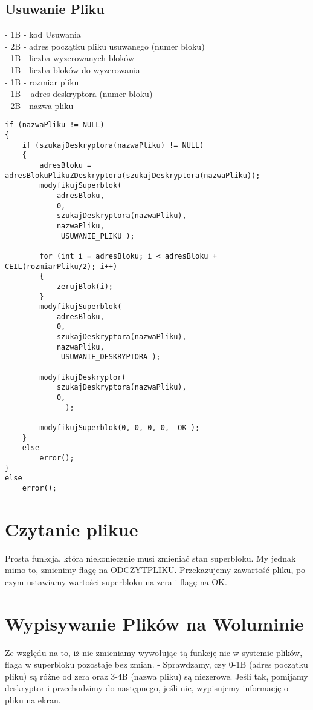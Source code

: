 \documentclass[paper=a4, fontsize=11pt]{scrartcl} %
\numberwithin{equation}{section} %
\numberwithin{figure}{section} %
\numberwithin{table}{section} %
\begin{document}
\subsection{Usuwanie Pliku}
- 1B - kod Usuwania\\
- 2B - adres początku pliku usuwanego (numer bloku)\\
- 1B - liczba wyzerowanych bloków\\
- 1B - liczba bloków do wyzerowania\\
- 1B - rozmiar pliku\\
- 1B – adres deskryptora (numer bloku)\\
- 2B - nazwa pliku\\
\begin{samepage}
\begin{lstlisting}
if (nazwaPliku != NULL) 
{ 
    if (szukajDeskryptora(nazwaPliku) != NULL)
	{
        adresBloku = adresBlokuPlikuZDeskryptora(szukajDeskryptora(nazwaPliku)); 
        modyfikujSuperblok( 
            adresBloku, 
            0,  
            szukajDeskryptora(nazwaPliku), 
            nazwaPliku,  
             USUWANIE_PLIKU ); 
         
        for (int i = adresBloku; i < adresBloku + CEIL(rozmiarPliku/2); i++) 
		{
            zerujBlok(i); 
		} 
        modyfikujSuperblok( 
            adresBloku, 
            0,  
            szukajDeskryptora(nazwaPliku), 
            nazwaPliku,  
             USUWANIE_DESKRYPTORA ); 
 
        modyfikujDeskryptor( 
            szukajDeskryptora(nazwaPliku), 
            0,  
              ); 
 
        modyfikujSuperblok(0, 0, 0, 0,  OK ); 
    }
	else 
        error(); 
} 
else 
    error(); 
\end{lstlisting}
\end{samepage}

\section{Czytanie plikue}
Prosta funkcja, która niekoniecznie musi zmieniać stan superbloku. My jednak mimo to, zmienimy flagę na ODCZYTPLIKU. Przekazujemy zawartość pliku, po czym ustawiamy wartości superbloku na zera i flagę na OK.

\section{Wypisywanie Plików na Woluminie}
Ze względu na to, iż nie zmieniamy wywołując tą funkcję nic w systemie plików, flaga w superbloku pozostaje bez zmian.  
- Sprawdzamy, czy 0-1B (adres początku pliku) są różne od zera oraz 3-4B (nazwa pliku) są niezerowe. Jeśli tak, pomijamy deskryptor i przechodzimy do następnego, jeśli nie, wypisujemy informację o pliku na ekran.

\end{document}
